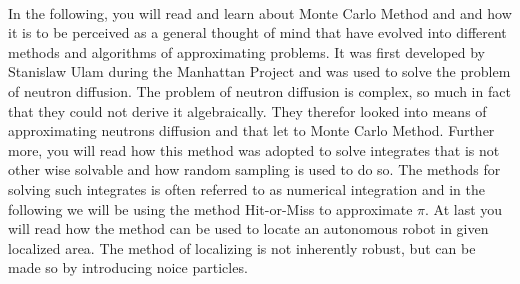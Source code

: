 \documentclass[../SRP.tex]{subfiles}
\begin{document}
\begin{titlepage}
  \begin{center}
  \begin{minipage}{0.8\textwidth}
    \\
    \justify
    In the following, you will read and learn about Monte Carlo Method and and how it is to be perceived as a general thought of mind that have evolved into different methods and algorithms of approximating problems. It was first developed by Stanislaw Ulam during the Manhattan Project and was used to solve the problem of neutron diffusion. The problem of neutron diffusion is complex, so much in fact that they could not derive it algebraically. They therefor looked into means of approximating neutrons diffusion and that let to Monte Carlo Method. Further more, you will read how this method was adopted to solve integrates that is not other wise solvable and how random sampling is used to do so. The methods for solving such integrates is often referred to as numerical integration and in the following we will be using the method Hit-or-Miss to approximate $\pi$. At last you will read how the method can be used to locate an autonomous robot in given localized area. The method of localizing is not inherently robust, but can be made so by introducing noice particles. 
  \end{minipage}
  \end{center}
\end{titlepage}
\end{document}
